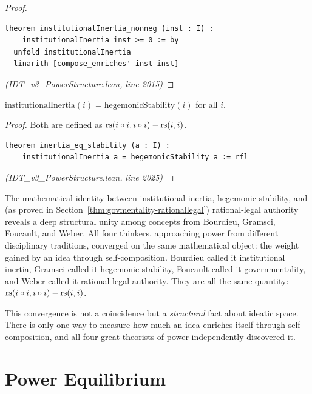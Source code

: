 \begin{proof}
\begin{lstlisting}
theorem institutionalInertia_nonneg (inst : I) :
    institutionalInertia inst >= 0 := by
  unfold institutionalInertia
  linarith [compose_enriches' inst inst]
\end{lstlisting}
\textit{(IDT\_v3\_PowerStructure.lean, line 2015)}
\end{proof}

\begin{theorem}
\label{thm:inertia-stability}
$\mathrm{institutionalInertia}(i) = \mathrm{hegemonicStability}(i)$ for all $i$.
\end{theorem}

\begin{proof}
Both are defined as $\mathrm{rs}(i \circ i, i \circ i) - \mathrm{rs}(i, i)$.
\begin{lstlisting}
theorem inertia_eq_stability (a : I) :
    institutionalInertia a = hegemonicStability a := rfl
\end{lstlisting}
\textit{(IDT\_v3\_PowerStructure.lean, line 2025)}
\end{proof}

\begin{interpretation}
The mathematical identity between institutional inertia, hegemonic stability,
and (as proved in Section~\ref{thm:govmentality-rationallegal}) rational-legal
authority reveals a deep structural unity among concepts from Bourdieu, Gramsci,
Foucault, and Weber. All four thinkers, approaching power from different
disciplinary traditions, converged on the same mathematical object: the weight
gained by an idea through self-composition. Bourdieu called it institutional
inertia, Gramsci called it hegemonic stability, Foucault called it
governmentality, and Weber called it rational-legal authority. They are
all the same quantity: $\mathrm{rs}(i \circ i, i \circ i) - \mathrm{rs}(i,i)$.

This convergence is not a coincidence but a \emph{structural} fact about
ideatic space. There is only one way to measure how much an idea enriches
itself through self-composition, and all four great theorists of power
independently discovered it.
\end{interpretation}

\section{Power Equilibrium}

